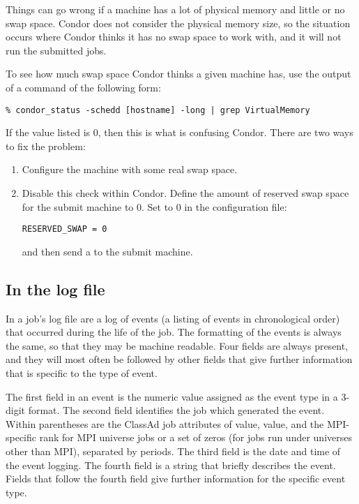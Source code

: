 Things can go wrong if a machine has a lot of physical memory and
little or no swap space.
Condor does not consider the physical memory size,
so the situation occurs where Condor thinks
it has no swap space to work with,
and it will not run the submitted jobs.

To see how much swap space Condor thinks a given machine has, use
the output of a  command of the following form:

\footnotesize
\begin{verbatim}
% condor_status -schedd [hostname] -long | grep VirtualMemory
\end{verbatim}
\normalsize
If the value listed is 0, then this is what is confusing Condor.
There are two ways to fix the problem:

\begin{enumerate}
\item Configure the machine with some real swap space.

\item Disable this check within Condor.
Define the amount of reserved swap space for the submit machine to 0.
Set  to 0 in the configuration file:

\begin{verbatim}
RESERVED_SWAP = 0
\end{verbatim}

and then send a  to the submit machine.
\end{enumerate}



\subsection{\label{sec:job-log-events}In the log file}
In a job's log file are a log of events (a listing of events in
chronological order) that occurred during the life of the job.
The formatting of the events is always the same, 
so that they may be machine readable.
Four fields are always present,
and they will most often be followed by other fields that give further
information that is specific to the type of event.

The first field in an event is the numeric value assigned as the
event type in a 3-digit format.
The second field identifies the job which generated the event. 
Within parentheses are the ClassAd job attributes of
 value, 
 value, 
and the MPI-specific rank for MPI universe jobs or a set of zeros
(for jobs run under universes other than MPI),
separated by periods.
The third field is the date and time of the event logging.  
The fourth field is a string that briefly describes the event.
Fields that follow the fourth field give further information for the specific
event type.

